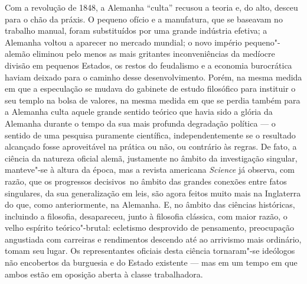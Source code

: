 Com a revolução de 1848, a Alemanha ``culta'' recusou a teoria e, do
alto, desceu para o chão da práxis. O pequeno ofício e a manufatura, que
se baseavam no trabalho manual, foram substituídos por uma grande
indústria efetiva; a Alemanha voltou a aparecer no mercado mundial; o
novo império pequeno"-alemão eliminou pelo
menos as mais gritantes inconveniências da medíocre divisão em pequenos
Estados, os restos 
do feudalismo e a economia burocrática haviam deixado para o caminho
desse desenvolvimento. Porém, na mesma medida em que a especulação se
mudava do gabinete de estudo filosófico para instituir o seu templo na
bolsa de valores, na mesma medida em que se perdia também para a
Alemanha culta aquele grande sentido teórico que havia sido a glória da
Alemanha durante o tempo da sua mais profunda degradação política --- o
sentido de uma pesquisa puramente científica, independentemente se o
resultado alcançado fosse aproveitável na prática ou não, ou contrário
às regras. De fato, a ciência da natureza oficial alemã, justamente no
âmbito da investigação singular, manteve"-se à altura da época, mas a
revista americana \emph{Science} já observa, com razão, que os
progressos decisivos\est\ no âmbito das grandes conexões entre fatos
singulares, da sua generalização em leis, são agora feitos muito mais na
Inglaterra do que, como anteriormente, na Alemanha. E, no âmbito das
ciências históricas, incluindo a filosofia, desapareceu, junto à
filosofia clássica, com maior razão, o velho 
espírito teórico"-brutal: ecletismo desprovido
de pensamento, preocupação angustiada com carreiras e rendimentos
descendo até ao arrivismo  mais ordinário, tomam seu 
lugar. Os representantes oficiais desta ciência tornaram"-se ideólogos
não encobertos da burguesia e do Estado existente --- mas em um tempo em
que ambos estão em oposição aberta à classe trabalhadora.

